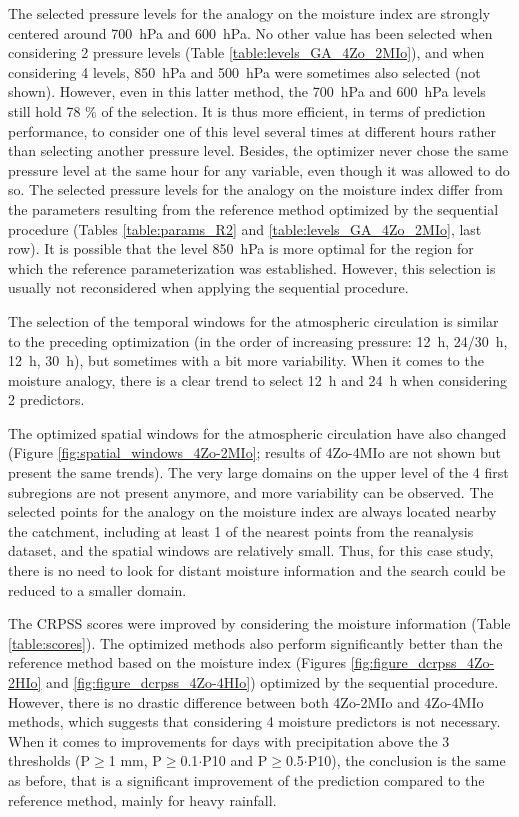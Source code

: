 \documentclass[review]{elsarticle}
\begin{document}
The selected pressure levels for the analogy on the moisture index are strongly centered around 700~hPa and 600~hPa. No other value has been selected when considering 2 pressure levels (Table \ref{table:levels_GA_4Zo_2MIo}), and when considering 4 levels, 850~hPa and 500~hPa were sometimes also selected (not shown). However, even in this latter method, the 700~hPa and 600~hPa levels still hold 78 \% of the selection. It is thus more efficient, in terms of prediction performance, to consider one of this level several times at different hours rather than selecting another pressure level. Besides, the optimizer never chose the same pressure level at the same hour for any variable, even though it was allowed to do so. The selected pressure levels for the analogy on the moisture index differ from the parameters resulting from the reference method optimized by the sequential procedure (Tables \ref{table:params_R2} and \ref{table:levels_GA_4Zo_2MIo}, last row). It is possible that the level 850~hPa is more optimal for the region for which the reference parameterization was established. However, this selection is usually not reconsidered when applying the sequential procedure.

The selection of the temporal windows for the atmospheric circulation is similar to the preceding optimization (in the order of increasing pressure: 12~h, 24/30~h, 12~h, 30~h), but sometimes with a bit more variability. When it comes to the moisture analogy, there is a clear trend to select 12~h and 24~h when considering 2 predictors.

The optimized spatial windows for the atmospheric circulation have also changed (Figure \ref{fig:spatial_windows_4Zo-2MIo}; results of 4Zo-4MIo are not shown but present the same trends). The very large domains on the upper level of the 4 first subregions are not present anymore, and more variability can be observed. The selected points for the analogy on the moisture index are always located nearby the catchment, including at least 1 of the nearest points from the reanalysis dataset, and the spatial windows are relatively small. Thus, for this case study, there is no need to look for distant moisture information and the search could be reduced to a smaller domain. 

The CRPSS scores were improved by considering the moisture information (Table \ref{table:scores}). The optimized methods also perform significantly better than the reference method based on the moisture index (Figures \ref{fig:figure_dcrpss_4Zo-2HIo} and \ref{fig:figure_dcrpss_4Zo-4HIo}) optimized by the sequential procedure. However, there is no drastic difference between both 4Zo-2MIo and 4Zo-4MIo methods, which suggests that considering 4 moisture predictors is not necessary. When it comes to improvements for days with precipitation above the 3 thresholds (P\(\geq\)1 mm, P\(\geq\)0.1\(\cdot\)P10 and P\(\geq\)0.5\(\cdot\)P10), the conclusion is the same as before, that is a significant improvement of the prediction compared to the reference method, mainly for heavy rainfall.
\end{document}
